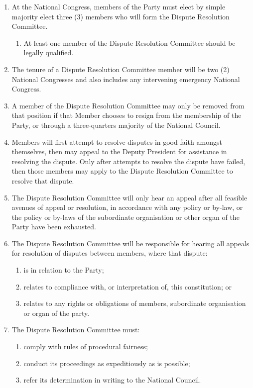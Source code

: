 \documentclass[a4paper,titlepage,8.5pt]{article}
\begin{document}
\begin{enumerate}
\item At the National Congress, members of the Party must elect by simple majority elect three (3) members who will form the Dispute Resolution Committee.
\begin{enumerate}
\item At least one member of the Dispute Resolution Committee should be legally qualified.
\end{enumerate}
\item The tenure of a Dispute Resolution Committee member will be two (2) National Congresses and also includes any intervening emergency National Congress.
\item A member of the Dispute Resolution Committee may only be removed from that position if that Member chooses to resign from the membership of the Party, or through a three-quarters majority of the National Council.
\item Members will first attempt to resolve disputes in good faith amongst themselves, then may appeal to the Deputy President for assistance in resolving the dispute. Only after attempts to resolve the dispute have failed, then those members may apply to the Dispute Resolution Committee to resolve that dispute.
\item The Dispute Resolution Committee will only hear an appeal after all feasible avenues of appeal or resolution, in accordance with any policy or by-law, or the policy or by-laws of the subordinate organisation or other organ of the Party have been exhausted.
\item The Dispute Resolution Committee will be responsible for hearing all appeals for resolution of disputes between members, where that dispute:
\begin{enumerate}
\item is in relation to the Party;
\item relates to compliance with, or interpretation of, this constitution; or
\item relates to any rights or obligations of members, subordinate organisation or organ of the party.
\end{enumerate}
\item The Dispute Resolution Committee must:
\begin{enumerate}
\item comply with rules of procedural fairness;
\item conduct its proceedings as expeditiously as is possible;
\item refer its determination in writing to the National Council.

\end{enumerate}
\end{enumerate}
\end{document}

